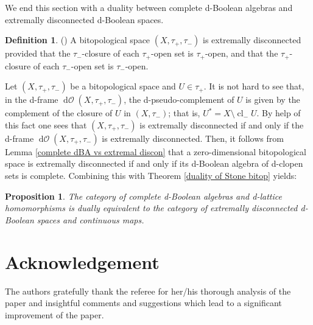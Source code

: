 \documentclass[11pt]{article}
\DeclareMathOperator{\cl}{cl}
\DeclareMathOperator{\dO}{d\mathcal{O}}
\theoremstyle{plain}
\newtheorem{prop}[thm]{Proposition}
\theoremstyle{definition}
\newtheorem{defn}[thm]{Definition}
\begin{document}
We end this section with a duality between complete d-Boolean algebras and extremally disconnected d-Boolean spaces. 


\begin{defn} (\cite[Definition 2.2]{Datta}) A bitopological space $(X,\tau_+,\tau_-)$ is  extremally disconnected provided that the $\tau_-$-closure of each $\tau_+$-open set is   $\tau_+$-open, and that the $\tau_+$-closure of each $\tau_-$-open set is $\tau_-$-open. \end{defn}

Let $(X,\tau_+,\tau_-)$ be a bitopological space and $U\in\tau_+$. It is not hard to see that, in the d-frame $\dO(X,\tau_+,\tau_-)$,  the d-pseudo-complement of $U$ is given by the complement of the closure of $U$ in $(X,\tau_-)$; that is, $U^*=X\setminus \cl_-U$. By help of this fact one sees that $(X,\tau_+,\tau_-)$ is extremally disconnected if and only if the d-frame $\dO(X,\tau_+,\tau_-)$ is extremally disconnected. Then, it follows from Lemma \ref{complete dBA vs extremal discon} that a zero-dimensional bitopological space is extremally disconnected if and only if its d-Boolean algebra of  d-clopen sets is complete.   Combining this  with Theorem \ref{duality of Stone bitop} yields: 
\begin{prop}
The category of complete d-Boolean algebras and d-lattice homomorphisms is dually equivalent to the category of extremally disconnected d-Boolean spaces and continuous maps.
\end{prop}

 \section*{Acknowledgement}

The authors gratefully thank the referee for her/his  thorough analysis of the paper and insightful comments and suggestions which lead to a significant improvement of the paper.  
\end{document}
